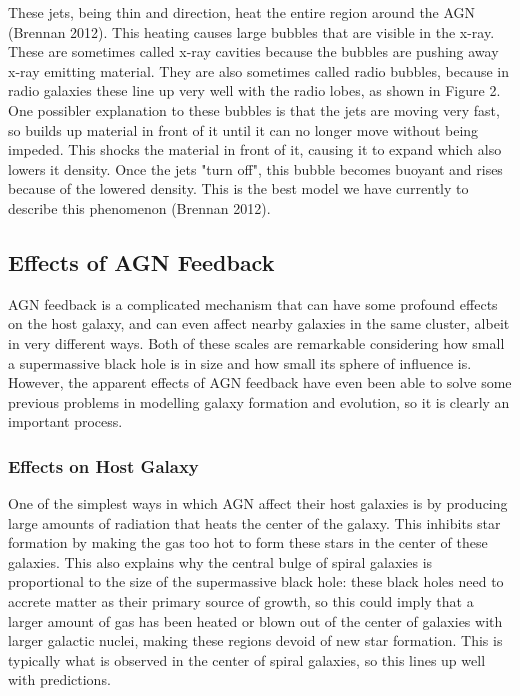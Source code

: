 \documentclass[12pt]{article}
\begin{document}
    These jets, being thin and direction, heat the entire region around the AGN
    (Brennan 2012).
    This heating causes large bubbles that are visible in the x-ray.  These are
    sometimes called x-ray cavities because the bubbles are pushing away x-ray
    emitting material.  They are also sometimes called radio bubbles, because in
    radio galaxies these line up very well with the radio lobes, as shown in
    Figure 2.  One possibler explanation to these bubbles is that the jets are
    moving very fast, so builds up material in front of it until it can no
    longer move without being impeded.  This shocks the material in front of
    it, causing it to expand which also lowers it density.  Once the jets "turn
    off", this bubble becomes buoyant and rises because of the lowered density.
    This is the best model we have currently to describe this phenomenon
    (Brennan 2012).

\subsection{Effects of AGN Feedback}
AGN feedback is a complicated mechanism that can have some profound effects on
the host galaxy, and can even affect nearby galaxies in the same cluster, albeit
in very different ways.  Both of these scales are remarkable considering how
small a supermassive black hole is in size and how small its sphere of influence
is.  However, the apparent effects of AGN feedback have even been able to solve
some previous problems in modelling galaxy formation and evolution, so it is
clearly an important process.

    \subsubsection{Effects on Host Galaxy}
    One of the simplest ways in which AGN affect their host galaxies is by
    producing large amounts of radiation that heats the center of the galaxy.
    This inhibits star formation by making the gas too hot to form these stars
    in the center of these galaxies.  This also explains why the central bulge
    of spiral galaxies is proportional to the size of the supermassive black
    hole: these black holes need to accrete matter as their primary source of
    growth, so this could imply that a larger amount of gas has been heated or
    blown out of the center of galaxies with larger galactic nuclei, making
    these regions devoid of new star formation.  This is typically what is
    observed in the center of spiral galaxies, so this lines up well with
    predictions.
\end{document}
